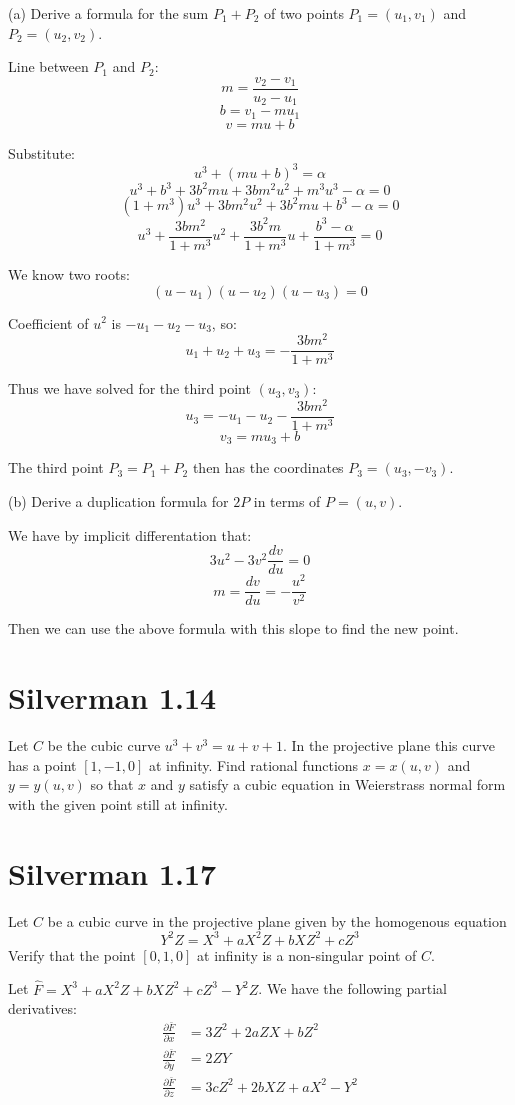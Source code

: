 \documentclass{article}
\begin{document}
(a) Derive a formula for the sum $P_1 + P_2$ of two points $P_1 = (u_1, v_1)$ and $P_2 = (u_2, v_2)$.

Line between $P_1$ and $P_2$:
$$m = \frac{v_2 - v_1}{u_2 - u_1}$$
$$b = v_1 - mu_1$$
$$v = mu + b$$

Substitute:
$$u^3 + (mu + b)^3 = \alpha$$
$$u^3 + b^3 + 3b^2mu + 3bm^2u^2 + m^3u^3 - \alpha = 0$$
$$(1+m^3) u^3 + 3bm^2 u^2 + 3b^2m u + b^3 - \alpha = 0$$
$$u^3 + \frac{3bm^2}{1+m^3}u^2 + \frac{3b^2m}{1+m^3}u + \frac{b^3-\alpha}{1+m^3} = 0$$

We know two roots:
$$(u-u_1)(u-u_2)(u-u_3) = 0$$

Coefficient of $u^2$ is $-u_1-u_2-u_3$, so:
$$u_1 + u_2 + u_3 = -\frac{3bm^2}{1+m^3}$$

Thus we have solved for the third point $(u_3,v_3)$:
$$u_3 = - u_1 - u_2 - \frac{3bm^2}{1+m^3}$$
$$v_3 = mu_3 + b$$

The third point $P_3 = P_1 + P_2$ then has the coordinates $P_3 = (u_3, -v_3)$.

(b) Derive a duplication formula for $2P$ in terms of $P = (u,v)$.

We have by implicit differentation that:
$$3u^2 - 3v^2 \frac{dv}{du} = 0$$
$$m = \frac{dv}{du} = -\frac{u^2}{v^2}$$

Then we can use the above formula with this slope to find the new point.

\section{Silverman 1.14}
Let $C$ be the cubic curve $u^3 + v^3 = u+v+1$. In the projective plane this curve has a point $[1,-1,0]$ at infinity. Find rational functions $x = x(u,v)$ and $y=y(u,v)$ so that $x$ and $y$ satisfy a cubic equation in Weierstrass normal form with the given point still at infinity.

\section{Silverman 1.17}
Let $C$ be a cubic curve in the projective plane given by the homogenous equation 
$$Y^2 Z = X^3 + aX^2 Z + bXZ^2 + cZ^3$$
Verify that the point $[0,1,0]$ at infinity is a non-singular point of $C$.

Let $\hat F = X^3 + aX^2 Z + bXZ^2 + cZ^3 - Y^2Z$. We have the following partial derivatives:
\begin{align*}
\frac{\partial \bar F}{\partial x} &= 3Z^2 + 2aZX + bZ^2 \\
\frac{\partial \bar F}{\partial y} &= 2ZY \\
\frac{\partial \bar F}{\partial z} &= 3cZ^2 + 2bXZ + aX^2 - Y^2
\end{align*}
\end{document}
